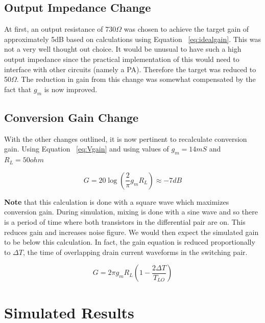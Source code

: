 \documentclass{article}                                                         %
\begin{document}
\subsection{Output Impedance Change}

At first, an output resistance of 730$\Omega$ was chosen to achieve the target gain of approximately 5dB based on calculations using
Equation ~\ref{eq:idealgain}.
This was not a very well thought out choice. It would be unusual to have such a high output impedance since the practical
implementation of this would need to interface with other circuits (namely a PA). Therefore the target was reduced
to 50$\Omega$. The reduction in gain from this change was somewhat compensated by the fact that $g_m$ is now improved.

\subsection{Conversion Gain Change}
With the other changes outlined, it is now pertinent to recalculate conversion gain. Using Equation ~\ref{eq:Vgain} and using
values of $g_m = 14mS$ and $R_L = 50 ohm$

\begin{equation}
  \label{eq:gaintargetnew}
  G = 20\log(\dfrac{2}{\pi}g_mR_L) \approx -7dB
\end{equation}

\vspace{3mm}\textbf{Note} that this calculation is done with a square wave which maximizes
conversion gain. During simulation, mixing is done with a sine wave and so there is a period of time
where both transistors in the differential pair are on. This reduces gain and increases noise figure.
We would then expect the simulated gain to be below this calculation. In fact, the gain equation is reduced
proportionally to $\Delta T$, the time of overlapping drain current waveforms in the switching pair.

\begin{equation}
  \label{eq:gaintargetnew}
  G = 2\pi g_m R_L (1 -\dfrac{2\Delta T}{T_{LO}})
\end{equation}

\newpage
\section{Simulated Results}
\end{document}
